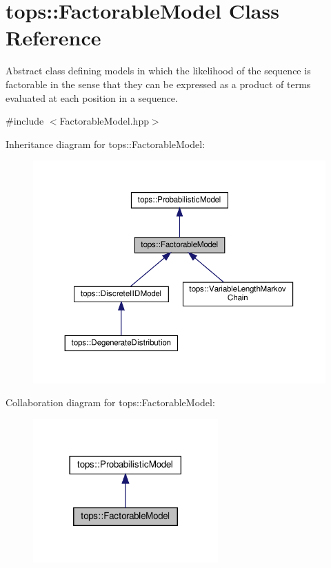 \hypertarget{classtops_1_1FactorableModel}{}\section{tops\+:\+:Factorable\+Model Class Reference}
\label{classtops_1_1FactorableModel}


Abstract class defining models in which the likelihood of the sequence is factorable in the sense that they can be expressed as a product of terms evaluated at each position in a sequence.  




{\ttfamily \#include $<$Factorable\+Model.\+hpp$>$}



Inheritance diagram for tops\+:\+:Factorable\+Model\+:
\nopagebreak
\begin{figure}[H]
\begin{center}
\leavevmode
\includegraphics[width=350pt]{classtops_1_1FactorableModel__inherit__graph}
\end{center}
\end{figure}


Collaboration diagram for tops\+:\+:Factorable\+Model\+:
\nopagebreak
\begin{figure}[H]
\begin{center}
\leavevmode
\includegraphics[width=201pt]{classtops_1_1FactorableModel__coll__graph}
\end{center}
\end{figure}
